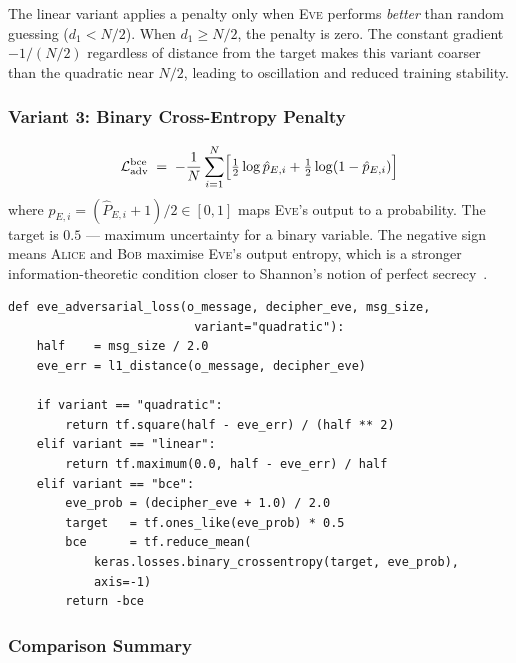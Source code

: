 \documentclass[12pt, a4paper]{article}
\newcommand{\alice}{\textsc{Alice}}
\newcommand{\bob}{\textsc{Bob}}
\newcommand{\eve}{\textsc{Eve}}
\begin{document}
The linear variant applies a penalty only when \eve{} performs
\emph{better} than random guessing ($d_1 < N/2$). When $d_1 \geq N/2$,
the penalty is zero. The constant gradient $-1/(N/2)$ regardless of
distance from the target makes this variant coarser than the quadratic
near $N/2$, leading to oscillation and reduced training stability.

\subsubsection*{Variant 3: Binary Cross-Entropy Penalty}

\begin{equation}
  \mathcal{L}_{\mathrm{adv}}^{\mathrm{bce}}
  \;=\;
  -\frac{1}{N}\sum_{i=1}^{N}
    \Bigl[
      \tfrac{1}{2}\log \hat{p}_{E,i}
    + \tfrac{1}{2}\log(1 - \hat{p}_{E,i})
    \Bigr]
  \label{eq:adv_bce}
\end{equation}
%
where $\hat{p}_{E,i} = (\hat{P}_{E,i}+1)/2 \in [0,1]$ maps \eve{}'s
output to a probability. The target is $0.5$ --- maximum uncertainty
for a binary variable. The negative sign means \alice{} and \bob{} maximise
\eve{}'s output entropy, which is a stronger information-theoretic
condition closer to Shannon's notion of perfect secrecy~\cite{shannon1949communication}.
\newpage
\begin{lstlisting}[caption={All three adversarial penalty variants}]
def eve_adversarial_loss(o_message, decipher_eve, msg_size,
                          variant="quadratic"):
    half    = msg_size / 2.0
    eve_err = l1_distance(o_message, decipher_eve)

    if variant == "quadratic":
        return tf.square(half - eve_err) / (half ** 2)
    elif variant == "linear":
        return tf.maximum(0.0, half - eve_err) / half
    elif variant == "bce":
        eve_prob = (decipher_eve + 1.0) / 2.0
        target   = tf.ones_like(eve_prob) * 0.5
        bce      = tf.reduce_mean(
            keras.losses.binary_crossentropy(target, eve_prob),
            axis=-1)
        return -bce
\end{lstlisting}

\subsubsection*{Comparison Summary}
\end{document}
